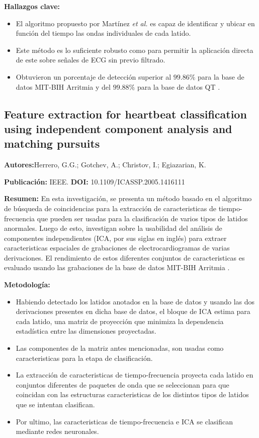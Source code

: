 \documentclass[12pt,letterpaper,oneside,openright]{book}
\begin{document}
\textbf{Hallazgos clave:}
\begin{itemize}
	\item El algoritmo propuesto por Martínez \textit{et al.} es capaz de identificar y ubicar en función del tiempo las ondas individuales de cada latido.
	\item Este método es lo suficiente robusto como para permitir la aplicación directa de este sobre señales de ECG sin previo filtrado.
	\item Obtuvieron un porcentaje de detección superior al $99.86\%$ para la base de datos MIT-BIH Arritmia \cite{arritmiadb} y del $99.88\%$ para la base de datos QT \cite{qtdb}.
\end{itemize}

\subsection{Feature extraction for heartbeat classification using independent component analysis and matching pursuits \cite{Herrero05}}

\textbf{Autores:}Herrero, G.G.; Gotchev, A.; Christov, I.; Egiazarian, K.

\textbf{Publicación:} IEEE.
\textbf{DOI:} 10.1109/ICASSP.2005.1416111

\textbf{Resumen:} En esta investigación, se presenta un método basado en el algoritmo de búsqueda de coincidencias para la extracción de caracteristicas de tiempo-frecuencia que pueden ser usadas para la clasificación de varios tipos de latidos anormales. Luego de esto, investigan sobre la usabilidad del análisis de componentes independientes (ICA, por sus siglas en inglés) para extraer caracteristicas espaciales de grabaciones de electrocardiogramas de varias derivaciones. El rendimiento de estos diferentes conjuntos de caracteristicas es evaluado usando las grabaciones de la base de datos MIT-BIH Arritmia \cite{arritmiadb}.

\textbf{Metodología:} 
\begin{itemize}
	\item Habiendo detectado los latidos anotados en la base de datos y usando las dos derivaciones presentes en dicha base de datos, el bloque de ICA estima para cada latido, una matriz de proyección que minimiza la dependencia estadística entre las dimensiones proyectadas.
	\item Las componentes de la matriz antes mencionadas, son usadas como caracteristicas para la etapa de clasificación.
	\item La extracción de caracteristicas de tiempo-frecuencia proyecta cada latido en conjuntos diferentes de paquetes de onda que se seleccionan para que coincidan con las estructuras caracteristicas de los distintos tipos de latidos que se intentan clasifican.
	\item Por ultimo, las caracteristicas de tiempo-frecuencia e ICA se clasifican mediante redes neuronales.
\end{itemize}
\end{document}
